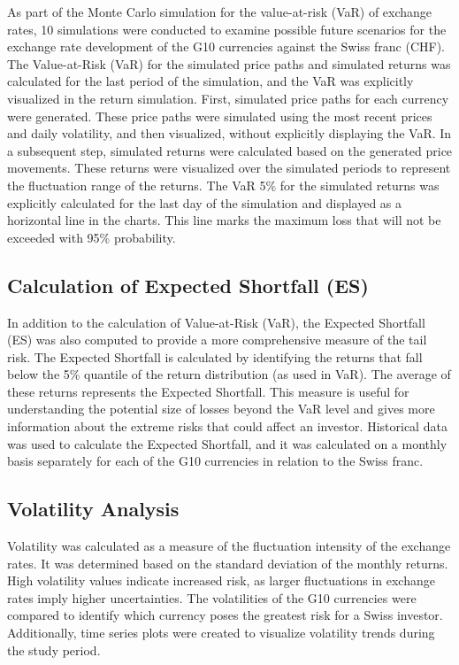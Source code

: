 \documentclass{article}
\begin{document}
As part of the Monte Carlo simulation for the value-at-risk (VaR) of exchange rates, 10 simulations were conducted to examine possible future scenarios for the exchange rate development of the G10 currencies against the Swiss franc (CHF). The Value-at-Risk (VaR) for the simulated price paths and simulated returns was calculated for the last period of the simulation, and the VaR was explicitly visualized in the return simulation.
First, simulated price paths for each currency were generated. These price paths were simulated using the most recent prices and daily volatility, and then visualized, without explicitly displaying the VaR.
In a subsequent step, simulated returns were calculated based on the generated price movements. These returns were visualized over the simulated periods to represent the fluctuation range of the returns. The VaR 5\% for the simulated returns was explicitly calculated for the last day of the simulation and displayed as a horizontal line in the charts. This line marks the maximum loss that will not be exceeded with 95\% probability.

\subsection{Calculation of Expected Shortfall (ES)}

In addition to the calculation of Value-at-Risk (VaR), the Expected Shortfall (ES) was also computed to provide a more comprehensive measure of the tail risk. The Expected Shortfall is calculated by identifying the returns that fall below the 5\% quantile of the return distribution (as used in VaR). The average of these returns represents the Expected Shortfall. This measure is useful for understanding the potential size of losses beyond the VaR level and gives more information about the extreme risks that could affect an investor. Historical data was used to calculate the Expected Shortfall, and it was calculated on a monthly basis separately for each of the G10 currencies in relation to the Swiss franc.

\subsection{Volatility Analysis}

Volatility was calculated as a measure of the fluctuation intensity of the exchange rates. It was determined based on the standard deviation of the monthly returns. High volatility values indicate increased risk, as larger fluctuations in exchange rates imply higher uncertainties. The volatilities of the G10 currencies were compared to identify which currency poses the greatest risk for a Swiss investor. Additionally, time series plots were created to visualize volatility trends during the study period.
\end{document}
